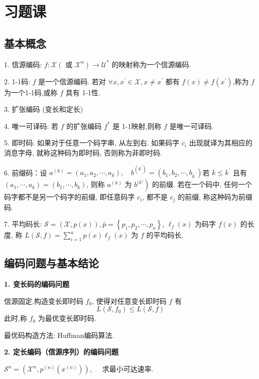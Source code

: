 \section{习题课}
\subsection{基本概念}

1. 信源编码: $ f: \mathscr{X}\left(\right. $ 或 $ \left.\mathscr{X}^{n}\right) \rightarrow \mathscr{U}^{*} $ 的映射称为一个信源编码.

2. 1-1码: $ f $ 是一个信源编码. 若对 $ \forall x, x^{\prime} \in \mathscr{X}, x \neq x^{\prime} $ 都有 $ f(x) \neq f\left(x^{\prime}\right) $,称为 $ f $ 为一个1-1码,或称 $ f $ 具有 1-1性.

3. 扩张编码 (变长和定长)

4. 唯一可译码: 若 $ f $ 的扩张编码 $ f^{*} $ 是 1-1映射,则称 $ f $ 是唯一可译码.

5. 即时码: 如果对于任意一个码字串, 从左到右. 如果码字 $ c_{i} $ 出现就译为其相应的消息字母, 就称这种码为即时码, 否则称为非即时码.

6. 前缀码：设 $ a^{(k)}=\left(a_{1}, a_{2}, \cdots, a_{k}\right), \quad b^{\left(k^{\prime}\right)}=\left(b_{1}, b_{2}, \cdots, b_{k^{\prime}}\right) $若 $ k \leq k^{\prime} $ 且有 $ \left(a_{1}, \cdots, a_{k}\right)=\left(b_{1}, \cdots, b_{k}\right) $, 则称 $ a^{(k)} $ 为 $ \left.b^{(k '}\right) $ 的前缀. 若在一个码中, 任何一个码字都不是另一个码字的前缀, 即任意码字 $ c_{i} $, 都不是 $ c_{j} $ 的前缀, 称这种码为前缀码.

7. 平均码长: $ \mathscr{S}=(\mathscr{X}, p(x)), \bar{p}=\left\{p_{1}, p_{2}, \cdots, p_{a}\right\} $, $ \ell_{f}(x) $ 为码字 $ f(x) $ 的长度, 称 $ L(\mathscr{S}, f)=\sum\limits_{i=1}^{a} p(x) \ell_{f}(x) $ 为 $ f $ 的平均码长.


\subsection{编码问题与基本结论}

\textbf{1. 变长码的编码问题}

信源固定,构造变长即时码 $ f_{0} $, 使得对任意变长即时码 $ f $ 有
$$
L\left(\mathscr{S}, f_{0}\right) \leq L(\mathscr{S}, f)
$$
此时,称 $ f_{0} $ 为最优变长即时码.

最优码构造方法: Huffman编码算法.

\textbf{2. 定长编码（信源序列）的编码问题}

$ \mathscr{S}^{n}=\left(\mathscr{X}^{n}, p^{(n)}\left(x^{(n)}\right)\right), \quad $ 求最小可达速率.

